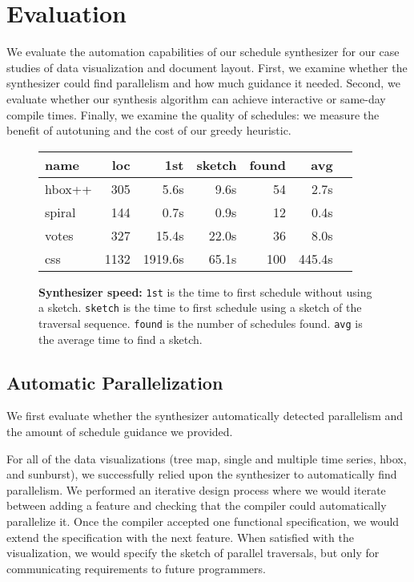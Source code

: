 \section{Evaluation}
We evaluate the automation capabilities of our schedule synthesizer for our case studies of data visualization and document layout. First, we examine whether the synthesizer could find parallelism and how much guidance it needed. Second, we evaluate whether our synthesis algorithm can achieve interactive or same-day compile times. Finally, we examine the quality of schedules: we measure the benefit of autotuning and the cost of our greedy heuristic.

\begin{figure}
\centering
\begin{tabular}{|l|r|r|r|r|r|r|} \hline
name & loc & 1st & sketch & found & avg \\ \hline
hbox++ & 305 & 5.6s & 9.6s & 54 & 2.7s   \\
spiral & 144 & 0.7s & 0.9s & 12 & 0.4s   \\
votes & 327 &  15.4s & 22.0s & 36 & 8.0s  \\
css & 1132 & 1919.6s & 65.1s & 100 & 445.4s \\ \hline
\end{tabular}
\caption{\textbf{Synthesizer speed:} \texttt{1st} is the time to first schedule without using a sketch. \texttt{sketch} is the time to first schedule using a sketch of the traversal sequence. \texttt{found} is the number of schedules found. \texttt{avg} is the average time to find a sketch.}
\label{fig:synthperf}
\end{figure}

\subsection{Automatic Parallelization}
We first evaluate whether the synthesizer automatically detected parallelism and the amount of schedule guidance we provided.

For all of the data visualizations (tree map, single and multiple time series, hbox, and sunburst), we successfully relied upon the synthesizer to automatically find parallelism. We performed an iterative design process where we would iterate between adding a feature and checking that the compiler could automatically parallelize it. Once the compiler accepted one functional specification, we would extend the specification with the next feature. When satisfied with the visualization, we would specify the sketch of parallel traversals, but only for communicating requirements to future programmers.

